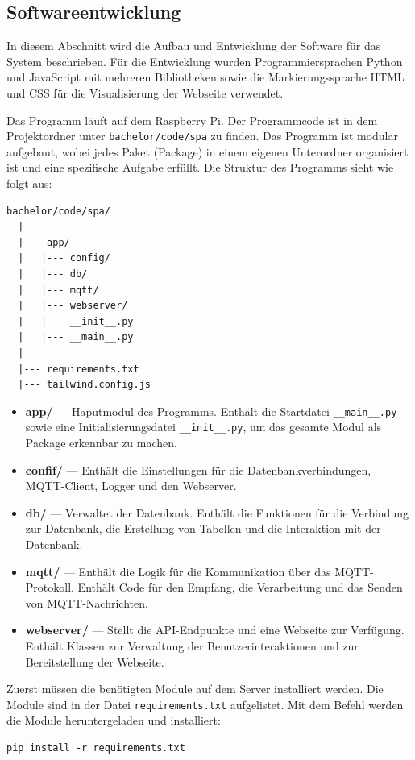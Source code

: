 \documentclass[12pt, letterpaper]{article}
\begin{document}
\subsection{Softwareentwicklung}
\par In diesem Abschnitt wird die Aufbau und Entwicklung der Software für das System beschrieben. Für die Entwicklung wurden Programmiersprachen Python und JavaScript mit mehreren Bibliotheken sowie die Markierungssprache HTML und CSS für die Visualisierung der Webseite verwendet.
\par Das Programm läuft auf dem Raspberry Pi. Der Programmcode ist in dem Projektordner unter \texttt{bachelor/code/spa} zu finden. Das Programm ist modular aufgebaut, wobei jedes Paket (Package) in einem eigenen Unterordner organisiert ist und eine spezifische Aufgabe erfüllt. Die Struktur des Programms sieht wie folgt aus:
\begin{Verbatim}[frame=single]
  bachelor/code/spa/
  |
  |--- app/
  |   |--- config/
  |   |--- db/
  |   |--- mqtt/
  |   |--- webserver/
  |   |--- __init__.py
  |   |--- __main__.py
  |
  |--- requirements.txt
  |--- tailwind.config.js  
\end{Verbatim}
\begin{itemize}
  \item \textbf{app/} --- Haputmodul des Programms. Enthält die Startdatei \texttt{\_\_main\_\_.py} sowie eine Initialisierungsdatei \texttt{\_\_init\_\_.py}, um das gesamte Modul als Package erkennbar zu machen.
  \item \textbf{confif/} --- Enthält die Einstellungen für die Datenbankverbindungen, MQTT-Client, Logger und den Webserver.
  \item \textbf{db/} --- Verwaltet der Datenbank. Enthält die Funktionen für die Verbindung zur Datenbank, die Erstellung von Tabellen und die Interaktion mit der Datenbank.
  \item \textbf{mqtt/} --- Enthält die Logik für die Kommunikation über das MQTT-Protokoll. Enthält Code für den Empfang, die Verarbeitung und das Senden von MQTT-Nachrichten.
  \item \textbf{webserver/} --- Stellt die API-Endpunkte und eine Webseite zur Verfügung. Enthält Klassen zur Verwaltung der Benutzerinteraktionen und zur Bereitstellung der Webseite.
\end{itemize} 
\par Zuerst müssen die benötigten Module auf dem Server installiert werden. Die Module sind in der Datei \texttt{requirements.txt} aufgelistet. Mit dem Befehl werden die Module heruntergeladen und installiert:
\begin{Verbatim}[frame=single]
  pip install -r requirements.txt
\end{Verbatim}
\end{document}
